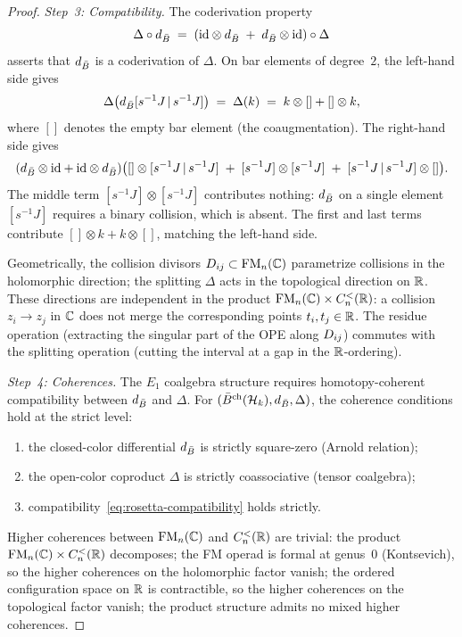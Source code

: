 \begin{proof}
\medskip
\noindent\textit{Step~3: Compatibility.}\enspace
The coderivation property
\begin{equation}\label{eq:rosetta-compatibility}
\Delta \circ d_{\bar{B}}
\;=\;
(\mathrm{id} \otimes d_{\bar{B}} \;+\; d_{\bar{B}} \otimes \mathrm{id})
\circ \Delta
\end{equation}
asserts that $d_{\bar{B}}$ is a coderivation of $\Delta$. On bar elements of degree~$2$, the left-hand side gives
\[
\Delta\bigl(d_{\bar{B}}[s^{-1}J \,|\, s^{-1}J]\bigr)
\;=\;
\Delta(k)
\;=\;
k \otimes [] + [] \otimes k,
\]
where $[]$ denotes the empty bar element (the coaugmentation).
The right-hand side gives
\[
(d_{\bar{B}} \otimes \mathrm{id} + \mathrm{id} \otimes d_{\bar{B}})\bigl(
 [] \otimes [s^{-1}J \,|\, s^{-1}J]
 \;+\;
 [s^{-1}J] \otimes [s^{-1}J]
 \;+\;
 [s^{-1}J \,|\, s^{-1}J] \otimes []
\bigr).
\]
The middle term $[s^{-1}J] \otimes [s^{-1}J]$ contributes nothing: $d_{\bar{B}}$ on a single element $[s^{-1}J]$ requires a binary collision, which is absent. The first and last terms contribute $[] \otimes k + k \otimes []$, matching the left-hand side.

Geometrically, the collision divisors $D_{ij} \subset \mathrm{FM}_n(\mathbb{C})$ parametrize collisions in the holomorphic direction; the splitting $\Delta$ acts in the topological direction on $\mathbb{R}$. These directions are independent in the product $\mathrm{FM}_n(\mathbb{C}) \times C_n^{<}(\mathbb{R})$: a collision $z_i \to z_j$ in $\mathbb{C}$ does not merge the corresponding points $t_i, t_j \in \mathbb{R}$. The residue operation (extracting the singular part of the OPE along $D_{ij}$) commutes with the splitting operation (cutting the interval at a gap in the $\mathbb{R}$-ordering).

\medskip
\noindent\textit{Step~4: Coherences.}\enspace
The $E_1$ coalgebra structure requires homotopy-coherent compatibility between $d_{\bar{B}}$ and $\Delta$. For $(\bar{B}^{\mathrm{ch}}(\mathcal{H}_k), d_{\bar{B}}, \Delta)$, the coherence conditions hold at the strict level:
\begin{enumerate}[label=(\alph*)]
\item the closed-color differential $d_{\bar{B}}$ is strictly square-zero (Arnold relation);
\item the open-color coproduct $\Delta$ is strictly coassociative (tensor coalgebra);
\item compatibility~\eqref{eq:rosetta-compatibility} holds strictly.
\end{enumerate}
Higher coherences between $\mathrm{FM}_n(\mathbb{C})$ and $C_n^{<}(\mathbb{R})$ are trivial: the product $\mathrm{FM}_n(\mathbb{C}) \times C_n^{<}(\mathbb{R})$ decomposes; the FM operad is formal at genus~$0$ (Kontsevich), so the higher coherences on the holomorphic factor vanish; the ordered configuration space on $\mathbb{R}$ is contractible, so the higher coherences on the topological factor vanish; the product structure admits no mixed higher coherences.
\end{proof}


